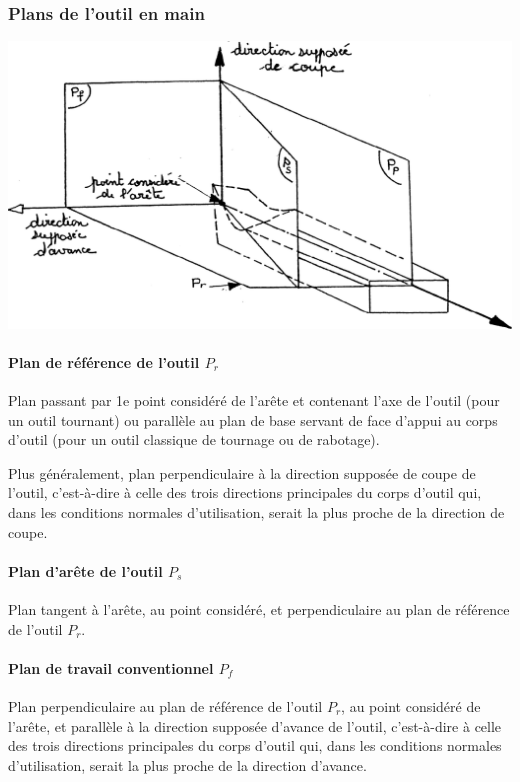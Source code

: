 \documentclass[11pt,oneside]{article}
\begin{document}
\subsubsection{Plans de l'outil en main}

\begin{center}
\includegraphics[width=.8\textwidth]{png/fig_13}
\end{center}

\paragraph{Plan de référence de l'outil $P_r$}
Plan passant par 1e point considéré de l'arête et contenant l'axe de l'outil (pour un outil tournant) ou parallèle au plan de base servant de face d'appui au corps d'outil (pour un outil classique de tournage ou de rabotage). 

Plus généralement, plan perpendiculaire à la direction supposée de coupe de l'outil, c'est-à-dire à celle des trois directions principales du corps d'outil qui, dans les conditions normales d'utilisation, serait la plus proche de la direction de coupe.
 
\paragraph{Plan d'arête de l'outil $P_s$}
Plan tangent à l'arête, au point considéré, et perpendiculaire au plan de référence de l'outil $P_r$. 


\paragraph{Plan de travail conventionnel $P_f$}

Plan perpendiculaire au plan de référence de l'outil $P_r$, au point considéré de l'arête, et parallèle à la direction supposée d'avance de l'outil, c'est-à-dire à celle des trois directions principales du corps d'outil qui, dans les conditions normales d'utilisation, serait la plus proche de la direction d'avance. 
\end{document}

